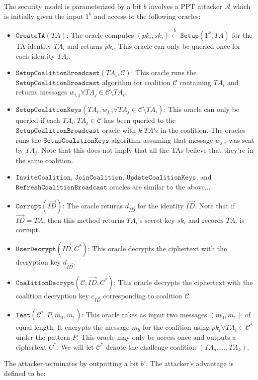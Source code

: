 \documentclass[10pt]{llncs}
\newcommand{\A}{\mathcal{A}}
\newcommand{\C}{\mathcal{C}}
\newcommand{\ID}{\mathit{ID}}
\newcommand{\TA}{\mathit{TA}}
\newcommand{\getsr}{\stackrel{{\scriptscriptstyle\$}}{\gets}}
\begin{document}
The security model is parameterized by a bit $b$ involves a PPT attacker $\A$ which is initially given the input $1^k$ and access to the following oracles:
\begin{itemize}
\item $\texttt{CreateTA}(\TA)$: The oracle computes $(pk_i,sk_i)\getsr \texttt{Setup}(1^{k},\TA)$ for the TA identity $\TA_i$ and returns $pk_i$. This oracle can only be queried once for each identity $\TA_i$.
\medskip

\item $\texttt{SetupCoalitionBroadcast}(\TA_i,\C)$: This oracle runs the $\texttt{SetupCoalitionBroadcast}$ algorithm for coalition $\C$ containing $\TA_i$ and returns messages $w_{i,j} \forall \TA_j \in \C \setminus \TA_i$.
\medskip

\item $\texttt{SetupCoalitionKeys}(\TA_i, w_{j,i}\forall \TA_j \in \C \setminus \TA_i)$: This oracle can only be queried if each $\TA_i, \TA_j \in \C$ has been queried to the $\texttt{SetupCoalitionBroadcast}$ oracle with $k$ $\TA$'s in the coalition. The oracles runs the $\texttt{SetupCoalitionKeys}$ algorithm assuming that message $w_{j,i}$ was sent by $\TA_{j}$. Note that this does not imply that all the TAs believe that they're in the same coalition.
\medskip

\item $\texttt{InviteCoalition}$, $\texttt{JoinCoalition}$, $\texttt{UpdateCoalitionKeys}$, and $\texttt{RefreshCoalitionBroadcast}$ oracles are similar to the above...
\medskip

\item $\texttt{Corrupt}(\vec{\ID})$: The oracle returns $d_{\vec{\ID}}$ for the identity $\vec{\ID}$.  Note that if $\vec{\ID} = TA_i$ then this method returns $\TA_i$'s secret key $sk_i$ and records $\TA_i$ is corrupt.
\medskip

\item $\texttt{UserDecrypt}(\vec{\ID},C^{*})$: This oracle decrypts the ciphertext with the decryption key $d_{\vec{\ID}}$.
\medskip

\item $\texttt{CoalitionDecrypt}(\C,\vec{\ID},C^{*})$: This oracle decrypts the ciphertext with the coalition decryption key $c_{\vec{\ID}}$ corresponding to coalition $\C$.
\medskip

\item $\texttt{Test}(\C^*,\mathit{P},m_{0},m_{1})$: This oracle takes as input two messages $(m_{0},m_{1})$ of equal length. It encrypts the message $m_{b}$ for the coalition using $pk_i \forall \TA_i \in \C^*$ under the pattern $\mathit{P}$. This oracle may only be access once and outputs a ciphertext $C^{*}$. We will let $\C^*$ denote the challenge coalition $(\TA_{a},\ldots,\TA_{k})$.
\end{itemize}
The attacker terminates by outputting a bit $b'$. The attacker's advantage is defined to be:
\end{document}
